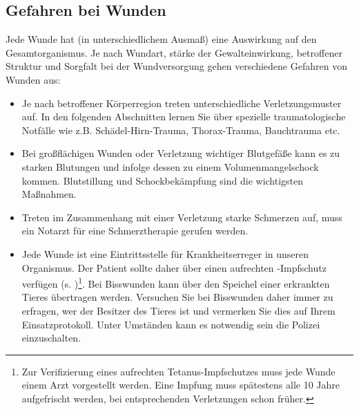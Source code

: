 \subsection{Gefahren bei Wunden}
Jede Wunde hat (in unterschiedlichem Ausmaß) eine Auswirkung auf den
Gesamtorganismus. Je nach Wundart, stärke der Gewalteinwirkung, betroffener
Struktur und Sorgfalt bei der Wundversorgung gehen verschiedene Gefahren von
Wunden aus:
\begin{itemize}
  \item {} Je nach
  betroffener Körperregion treten unterschiedliche Verletzungsmuster auf.  In
  den folgenden Abschnitten lernen Sie über spezielle traumatologische Notfälle
  wie z.B. Schädel-Hirn-Trauma, Thorax-Trauma, Bauchtrauma etc.
  \item {} Bei großflächigen Wunden oder Verletzung wichtiger
  Blutgefäße kann es zu starken Blutungen und infolge dessen zu einem 
  Volumenmangelschock kommen. Blutstillung und Schockbekämpfung sind  die
  wichtigsten Maßnahmen.
  \item {} Treten im Zusammenhang mit einer Verletzung 
  starke Schmerzen auf, muss ein Notarzt für eine Schmerztherapie gerufen werden.
  \item {} Jede Wunde ist eine
  Eintrittsstelle für Krankheitserreger in unseren Organismus. Der Patient
  sollte daher über einen aufrechten -Impfschutz verfügen 
  (s. )\footnote{Zur Verifizierung eines
  aufrechten Tetanus-Impfschutzes muss jede Wunde einem Arzt vorgestellt
  werden.  Eine Impfung muss spätestens alle 10 Jahre aufgefrischt werden,  bei
  entsprechenden Verletzungen schon früher.\cite{BoehmerTaschRett6}}.  Bei
  Bisswunden kann über den Speichel einer erkrankten Tieres 
  übertragen werden.  Versuchen Sie bei Bisswunden daher immer zu erfragen, wer der
  Besitzer des  Tieres ist und vermerken Sie dies auf Ihrem Einsatzprotokoll.
  Unter  Umständen kann es notwendig sein die Polizei einzuschalten.
\end{itemize}






